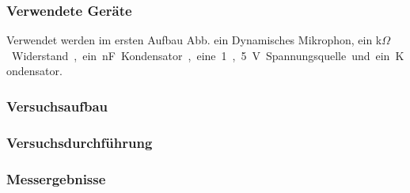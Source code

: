 \documentclass[12pt,a4paper]{article}
\begin{document}
\subsubsection*{Verwendete Geräte}
Verwendet werden im ersten Aufbau Abb. ein Dynamisches Mikrophon, ein \unit[4,7]{k$\Omega$} Widerstand, ein \unit[10]{nF} Kondensator, eine 1,5 V Spannungsquelle und ein Kondensator.
\subsubsection*{Versuchsaufbau}
\subsubsection*{Versuchsdurchführung}

\subsubsection*{Messergebnisse}
\end{document}
